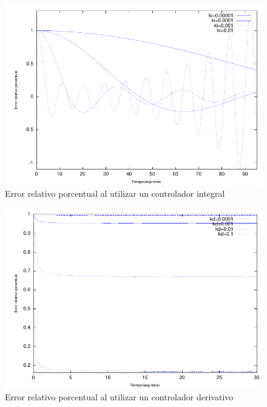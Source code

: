 \documentclass{sig-alternate}
\begin{document}
\begin{figure}[hp]
\label{errorMIntegral}
\centering
\includegraphics[scale=0.8]{graficos/errorMIntegral}
\caption{Error relativo porcentual al utilizar un controlador integral}
\end{figure}

\begin{figure}[hp]
\label{errorMDerivativo}
\centering
\includegraphics[scale=0.8]{graficos/errorMDerivativo}
\caption{Error relativo porcentual al utilizar un controlador derivativo}
\end{figure}
\end{document}
